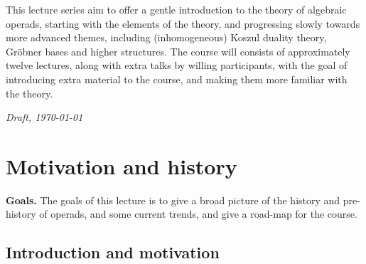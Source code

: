 \documentclass[fleqn,a4paper, twoside]{article}
\title{\vspace{-5 em}\setstretch{0.85}{\textbf{Algebraic operads, Koszul duality and Gr\"obner bases: an introduction}}}
\author{P. Tamaroff}
\date{August 22 and 24}
\newcommand{\0}{\langle 0\rangle}
\DeclareRobustCommand{\[}{\begin{equation}}%
\DeclareRobustCommand{\]}{\end{equation}}%
\theoremstyle{mytheorem}
\theoremstyle{introthm}
\theoremstyle{mydefinition}
\theoremstyle{mydefinition2}
\theoremstyle{plain} %
\newcommand{\?}{\,?\,}
\theoremstyle{mytheorem}
\theoremstyle{plain} %
\renewenvironment{abstract}{%
\small\begin{center}
\begin{minipage}{.9\textwidth}
}
{\par\noindent\end{minipage}\end{center}\vspace{3 em}}
\begin{document}
\maketitle


\thispagestyle{empty}

\begin{abstract}
This lecture series aim to offer a gentle introduction
to the theory of algebraic operads, starting with the
elements of the theory, and progressing slowly towards
more advanced themes, including (inhomogeneous)
Koszul duality theory, Gr\"obner bases and higher
structures. The course  will consists of approximately
twelve lectures, along with extra talks by
willing participants, with the goal of introducing extra
material to the course, and making them more
familiar with the theory.
\end{abstract}

\tableofcontents

\vfill
\hfill \emph{Draft, \today}

\pagebreak
\section{Motivation and history}

\textbf{Goals.} The goals of this lecture is to
give a broad picture of the history and 
pre-history of operads, and some current trends,
and give a road-map for the course.  

\subsection{Introduction and motivation}
\end{document}
